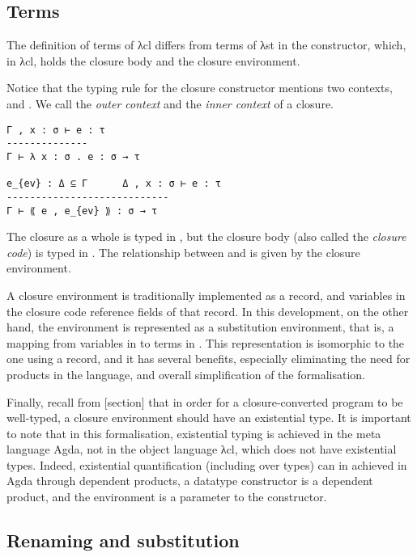 \documentclass[bsc,frontabs,twoside,singlespacing,parskip,deptreport]{infthesis}
\theoremstyle{definition}
\begin{document}
\subsection{Terms}
\label{sec:closure-language-cl-1}

The definition of terms of λcl differs from terms of λst in the 
constructor, which, in λcl, holds the closure body and the closure
environment.


Notice that the typing rule for the closure constructor 
mentions two contexts,  and . We call  the
\textit{outer context} and  the \textit{inner context} of a
closure.

\begin{verbatim}
Γ , x : σ ⊢ e : τ
--------------
Γ ⊢ λ x : σ . e : σ → τ

e_{ev} : Δ ⊆ Γ      Δ , x : σ ⊢ e : τ
----------------------------
Γ ⊢ ⟪ e , e_{ev} ⟫ : σ → τ
\end{verbatim}

The closure as a whole is typed in , but the closure body (also
called the \textit{closure code}) is typed in . The
relationship between  and  is given by the closure
environment.

A closure environment is traditionally implemented as a record, and
variables in the closure code reference fields of that record. In this
development, on the other hand, the environment is represented as a
substitution environment, that is, a mapping from variables in 
to terms in . This representation is isomorphic to the one using
a record, and it has several benefits, especially eliminating the need
for products in the language, and overall simplification of the
formalisation.

Finally, recall from [section] that in order for a closure-converted
program to be well-typed, a closure environment should have an
existential type. It is important to note that in this formalisation,
existential typing is achieved in the meta language Agda, not in the
object language λcl, which does not have existential types. Indeed,
existential quantification (including over types) can in achieved in
Agda through dependent products, a datatype constructor is a dependent
product, and the environment is a parameter to the  constructor.

\subsection{Renaming and substitution}
\label{sec:renam-subst}
\end{document}

